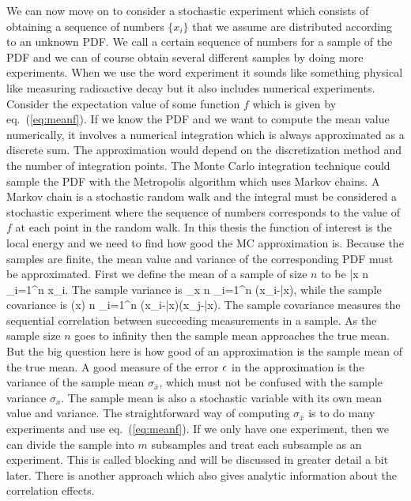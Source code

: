 We can now move on to consider a stochastic experiment which consists of obtaining a sequence of numbers $\{x_i\}$ that we assume are distributed according to an unknown PDF. We call a certain sequence of numbers for a sample of the PDF and we can of course obtain several different samples by doing more experiments. When we use the word experiment it sounds like something physical like measuring radioactive decay but it also includes numerical experiments. Consider the expectation value of some function $f$ which is given by eq.~(\ref{eq:meanf}). If we know the PDF and we want to compute the mean value numerically, it involves a numerical integration which is always approximated as a discrete sum. The approximation would depend on the discretization method and the number of integration points. The Monte Carlo integration technique could sample the PDF with the Metropolis algorithm which uses Markov chains. A Markov chain is a stochastic random walk and the integral must be considered a stochastic experiment where the sequence of numbers corresponds to the value of $f$ at each point in the random walk. In this thesis the function of interest is the local energy and we need to find how good the MC approximation is. Because the samples are finite, the mean value and variance of the corresponding PDF must be approximated. First we define the mean of a sample of size $n$ to be
\be
\bar x \equiv {} n \Sum_{i=1}^n x_i. 
\ee
The sample variance is
\be
\sigma_x \equiv {} n \Sum_{i=1}^n (x_i-\bar x),
\ee
while the sample covariance is
\be
\cov(x) \equiv {} n \Sum_{i=1}^n (x_i-\bar x)(x_j-\bar x).
\ee
The sample covariance measures the sequential correlation between succeeding measurements in a sample. As the sample size $n$ goes to infinity then the sample mean approaches the true mean. But the big question here is how good of an approximation is the sample mean of the true mean. A good measure of the error $\epsilon$ in the approximation is the variance of the sample mean $\sigma_{\bar x}$, which must not be confused with the sample variance $\sigma_x$. The sample mean is also a stochastic variable with its own mean value and variance. The straightforward way of computing $\sigma_{\bar x}$ is to do many experiments and use eq.~(\ref{eq:meanf}). If we only have one experiment, then we can divide the sample into $m$ subsamples and treat each subsample as an experiment. This is called blocking and will be discussed in greater detail a bit later. There is another approach which also gives analytic information about the correlation effects. 
\newline

